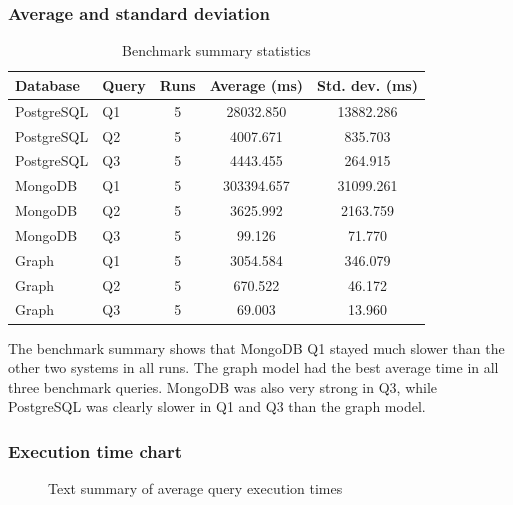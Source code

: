 \documentclass[11pt,a4paper]{article}
\begin{document}
\subsubsection{Average and standard deviation}
\begin{table}[htbp]
    \centering
    \caption{Benchmark summary statistics}
    \begin{tabular}{llccc}
        \hline
        Database & Query & Runs & Average (ms) & Std. dev. (ms) \\
        \hline
        PostgreSQL & Q1 & 5 & 28032.850 & 13882.286 \\
        PostgreSQL & Q2 & 5 & 4007.671 & 835.703 \\
        PostgreSQL & Q3 & 5 & 4443.455 & 264.915 \\
        MongoDB & Q1 & 5 & 303394.657 & 31099.261 \\
        MongoDB & Q2 & 5 & 3625.992 & 2163.759 \\
        MongoDB & Q3 & 5 & 99.126 & 71.770 \\
        Graph & Q1 & 5 & 3054.584 & 346.079 \\
        Graph & Q2 & 5 & 670.522 & 46.172 \\
        Graph & Q3 & 5 & 69.003 & 13.960 \\
        \hline
    \end{tabular}
\end{table}

The benchmark summary shows that MongoDB Q1 stayed much slower than the other two systems in all runs. The graph model had the best average time in all three benchmark queries. MongoDB was also very strong in Q3, while PostgreSQL was clearly slower in Q1 and Q3 than the graph model.

\subsubsection{Execution time chart}
\begin{figure}[htbp]
    \centering
    \caption{Text summary of average query execution times}
\end{figure}
\end{document}
